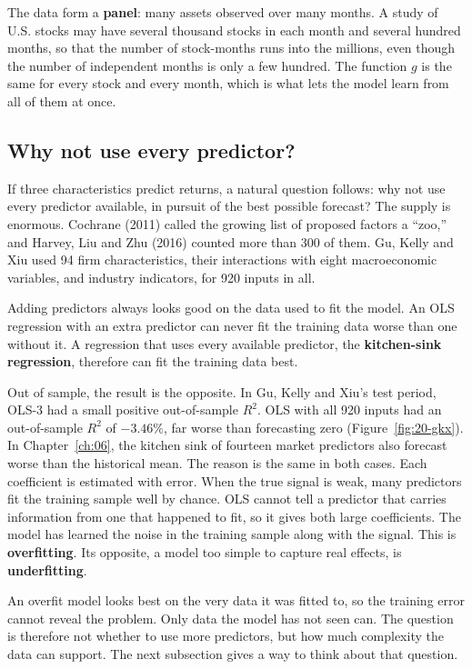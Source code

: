 The data form a \textbf{panel}: many assets observed over many months. A study of U.S. stocks may have several thousand stocks in each month and several hundred months, so that the number of stock-months runs into the millions, even though the number of independent months is only a few hundred. The function $g$ is the same for every stock and every month, which is what lets the model learn from all of them at once.

\subsection{Why not use every predictor?}
\label{sec:20-why}

If three characteristics predict returns, a natural question follows: why not use every predictor available, in pursuit of the best possible forecast? The supply is enormous. 
Cochrane (2011) called the growing list of proposed factors a ``zoo,'' and Harvey, Liu and Zhu (2016) counted more than 300 of them.
Gu, Kelly and Xiu used 94 firm characteristics, their interactions with eight macroeconomic variables, and industry indicators, for 920 inputs in all.

Adding predictors always looks good on the data used to fit the model. An OLS regression with an extra predictor can never fit the training data worse than one without it. A regression that uses every available predictor, the \textbf{kitchen-sink regression}, therefore can fit the training data best.

Out of sample, the result is the opposite. In Gu, Kelly and Xiu's test period, OLS-3 had a small positive out-of-sample $R^2$. OLS with all 920 inputs had an out-of-sample $R^2$ of $-3.46\%$, far worse than forecasting zero (Figure~\ref{fig:20-gkx}). In Chapter~\ref{ch:06}, the kitchen sink of fourteen market predictors also forecast worse than the historical mean. The reason is the same in both cases. Each coefficient is estimated with error. When the true signal is weak, many predictors fit the training sample well by chance. OLS cannot tell a predictor that carries information from one that happened to fit, so it gives both large coefficients. The model has learned the noise in the training sample along with the signal. This is \textbf{overfitting}. Its opposite, a model too simple to capture real effects, is \textbf{underfitting}.

An overfit model looks best on the very data it was fitted to, so the training error cannot reveal the problem. Only data the model has not seen can. The question is therefore not whether to use more predictors, but how much complexity the data can support. The next subsection gives a way to think about that question.

